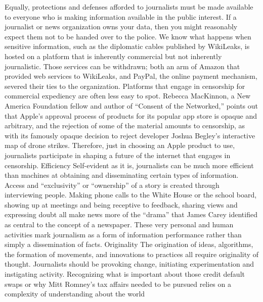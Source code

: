 Equally, protections and defenses afforded to journalists must be made available
to everyone who is making information available in the public interest. If a journalist
or news organization owns your data, then you might reasonably expect
them not to be handed over to the police.
We know what happens when sensitive information, such as the diplomatic
cables published by WikiLeaks, is hosted on a platform that is inherently commercial
but not inherently journalistic. Those services can be withdrawn; both an
arm of Amazon that provided web services to WikiLeaks, and PayPal, the online
payment mechanism, severed their ties to the organization. Platforms that engage
in censorship for commercial expediency are often less easy to spot. Rebecca
MacKinnon, a New America Foundation fellow and author of ``Consent of the
Networked,'' points out that Apple’s approval process of products for its popular
app store is opaque and arbitrary, and the rejection of some of the material
amounts to censorship, as with its famously opaque decision to reject developer
Joshua Begley’s interactive map of drone strikes. Therefore, just in choosing an
Apple product to use, journalists participate in shaping a future of the internet
that engages in censorship.
Efficiency
Self-evident as it is, journalists can be much more efficient than machines at
obtaining and disseminating certain types of information. Access and ``exclusivity''
or ``ownership'' of a story is created through interviewing people. Making
phone calls to the White House or the school board, showing up at meetings and
being receptive to feedback, sharing views and expressing doubt all make news
more of the ``drama'' that James Carey identified as central to the concept of a
newspaper. These very personal and human activities mark journalism as a form
of information performance rather than simply a dissemination of facts.
Originality
The origination of ideas, algorithms, the formation of movements, and innovations
to practices all require originality of thought. Journalists should be provoking
change, initiating experimentation and instigating activity. Recognizing what
is important about those credit default swaps or why Mitt Romney’s tax affairs
needed to be pursued relies on a complexity of understanding about the world

